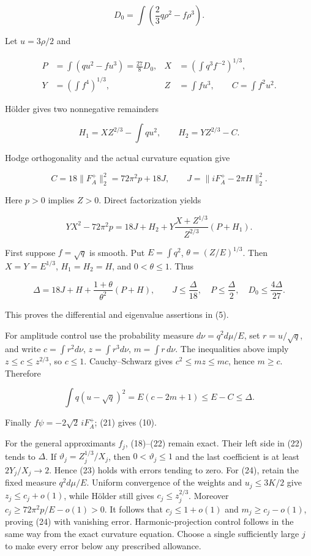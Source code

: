 \documentclass[
  11pt,
]{article}
\begin{document}
\[
 D_0=\int\left(\frac23q\rho^2-f\rho^3\right).
 \tag{18}
\]

Let \(u=3\rho/2\) and

\[
 \begin{aligned}
 P&=\int(qu^2-fu^3)=\frac{27}{8}D_0,&
 X&=\left(\int q^3f^{-2}\right)^{1/3},\\
 Y&=\left(\int f^4\right)^{1/3},&
 Z&=\int fu^3,\qquad C=\int f^2u^2.
 \end{aligned}
 \tag{19}
\]

Hölder gives two nonnegative remainders

\[
 H_1=XZ^{2/3}-\int qu^2,\qquad H_2=YZ^{2/3}-C.
 \tag{20}
\]

Hodge orthogonality and the actual curvature equation give

\[
 C=18\|F_A^+\|_2^2=72\pi^2p+18J,
 \qquad J=\|iF_A^+-2\pi H\|_2^2.
 \tag{21}
\]

Here \(p>0\) implies \(Z>0\). Direct factorization yields

\[
 YX^2-72\pi^2p
 =18J+H_2+
       Y\frac{X+Z^{1/3}}{Z^{2/3}}(P+H_1).
 \tag{22}
\]

First suppose \(f=\sqrt q\) is smooth. Put \(E=\int q^2\),
\(\theta=(Z/E)^{1/3}\). Then \(X=Y=E^{1/3}\), \(H_1=H_2=H\), and
\(0<\theta\le1\). Thus

\[
 \Delta=18J+H+\frac{1+\theta}{\theta^2}(P+H),
 \qquad
 J\le\frac\Delta{18},\quad
 P\le\frac\Delta2,\quad
 D_0\le\frac{4\Delta}{27}.
 \tag{23}
\]

This proves the differential and eigenvalue assertions in (5).

For amplitude control use the probability measure \(d\nu=q^2d\mu/E\),
set \(r=u/\sqrt q\), and write \(c=\int r^2d\nu\), \(z=\int r^3d\nu\),
\(m=\int r\,d\nu\). The inequalities above imply \(z\le c\le z^{2/3}\),
so \(c\le1\). Cauchy--Schwarz gives \(c^2\le mz\le mc\), hence
\(m\ge c\). Therefore

\[
 \int q(u-\sqrt q)^2=E(c-2m+1)\le E-C\le\Delta.
 \tag{24}
\]

Finally \(f\psi=-2\sqrt2\,iF_A^+\); (21) gives (10).

For the general approximants \(f_j\), (18)--(22) remain exact. Their
left side in (22) tends to \(\Delta\). If \(\vartheta_j=Z_j^{1/3}/X_j\),
then \(0<\vartheta_j\le1\) and the last coefficient is at least
\(2Y_j/X_j\to2\). Hence (23) holds with errors tending to zero. For
(24), retain the fixed measure \(q^2d\mu/E\). Uniform convergence of the
weights and \(u_j\le3K/2\) give \(z_j\le c_j+o(1)\), while Hölder still
gives \(c_j\le z_j^{2/3}\). Moreover \(c_j\ge72\pi^2p/E-o(1)>0\). It
follows that \(c_j\le1+o(1)\) and \(m_j\ge c_j-o(1)\), proving (24) with
vanishing error. Harmonic-projection control follows in the same way
from the exact curvature equation. Choose a single sufficiently large
\(j\) to make every error below any prescribed allowance.
\end{document}
